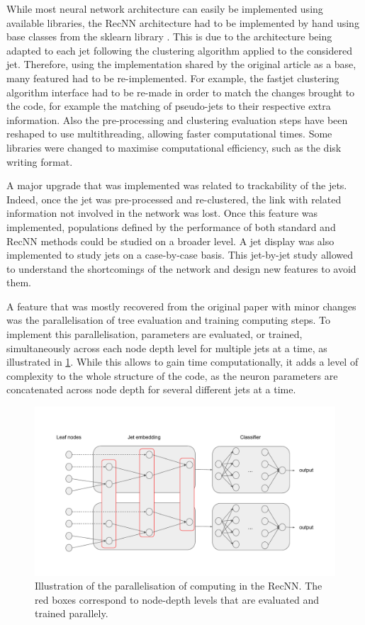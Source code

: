 While most neural network architecture can easily be implemented using available libraries, the RecNN architecture had to be implemented by hand using base classes from the sklearn library \cite{scikit-learn}. This is due to the architecture being adapted to each jet following the clustering algorithm applied to the considered jet. Therefore, using the implementation shared by the original article \cite{Louppe:2017ipp} as a base, many featured had to be re-implemented. For example, the fastjet \cite{Cacciari:2011ma} clustering algorithm interface had to be re-made in order to match the changes brought to the code, for example the matching of pseudo-jets to their respective extra information. Also the pre-processing and clustering evaluation steps have been reshaped to use multithreading, allowing faster computational times. Some libraries were changed to maximise computational efficiency, such as the disk writing format.

A major upgrade that was implemented was related to trackability of the jets. Indeed, once the jet was pre-processed and re-clustered, the link with related information not involved in the network was lost. Once this feature was implemented, populations defined by the performance of both standard and RecNN methods could be studied on a broader level. A jet display was also implemented to study jets on a case-by-case basis. This jet-by-jet study allowed to understand the shortcomings of the network and design new features to avoid them.

A feature that was mostly recovered from the original paper with minor changes was the parallelisation of tree evaluation and training computing steps. To implement this parallelisation, parameters are evaluated, or trained, simultaneously across each node depth level for multiple jets at a time, as illustrated in \ref{fig:RecNN_parall}. While this allows to gain time computationally, it adds a level of complexity to the whole structure of the code, as the neuron parameters are concatenated across node depth for several different jets at a time.

\begin{figure}
    \centering
    \includegraphics[width=\textwidth]{Images/RecNN_diagram_parall.pdf}
    \caption{Illustration of the parallelisation of computing in the RecNN. The red boxes correspond to node-depth levels that are evaluated and trained parallely.}
    \label{fig:RecNN_parall}
\end{figure}

